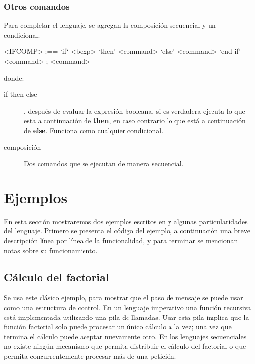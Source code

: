 \subsubsection*{Otros comandos}

Para completar el lenguaje, se agregan la composición secuencial y un condicional.

\begin{grammar}
  <IFCOMP> :== `if` <bexp> `then' <command> `else' <command> `end if'
  \alt <command> ; <command>
\end{grammar}

donde:

\begin{description}
\item [if-then-else], después de evaluar la expresión booleana, si es verdadera
  ejecuta lo que esta a continuación de \textbf{then}, en caso contrario lo que está a
  continuación de \textbf{else}. Funciona como cualquier condicional.
\item [composición] Dos comandos que se ejecutan de manera secuencial.

\end{description}

\section{Ejemplos}

En esta sección mostraremos dos ejemplos escritos en \SAL y algunas particularidades del lenguaje. Primero se presenta el código del ejemplo, a continuación una breve descripción línea por línea de la funcionalidad, y para terminar se mencionan notas sobre su funcionamiento.

\subsection{Cálculo del factorial}\label{sal:factorial}

Se usa este clásico ejemplo, para mostrar que el paso de mensaje se puede usar como una estructura de control. En un lenguaje imperativo una función recursiva está implementada utilizando una pila de llamadas. Usar esta pila implica que la función factorial solo puede procesar un único cálculo a la vez; una vez que termina el cálculo puede aceptar nuevamente otro. En los lenguajes secuenciales no existe ningún mecanismo que permita distribuir el cálculo del factorial o que permita concurrentemente procesar más de una petición.

